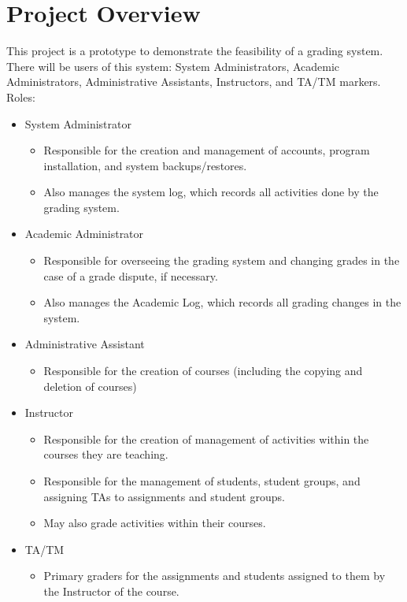 \documentclass{article}
\begin{document}
\section{Project Overview}
This project is a prototype to demonstrate the feasibility of a grading system.
There will be users of this system: System Administrators, Academic Administrators,
Administrative Assistants, Instructors,  and TA/TM markers.\\
Roles:
\begin{itemize}
  \item System Administrator
   \begin{itemize}
     \item Responsible for the creation and management of accounts, program
       installation, and system backups/restores.
     \item Also manages the system log, which records all activities done by the
       grading system.
   \end{itemize}
   \item Academic Administrator
     \begin{itemize}
       \item Responsible for overseeing the grading system and changing grades
         in the case of a grade dispute, if necessary.
       \item Also manages the Academic Log, which records all grading changes
         in the system.
     \end{itemize}
   \item Administrative Assistant
     \begin{itemize}
       \item Responsible for the creation of courses (including the copying
         and deletion of courses)
     \end{itemize}
   \item Instructor
     \begin{itemize}
       \item Responsible for the creation of management of activities within
         the courses they are teaching.
       \item Responsible for the management of students, student groups, and
         assigning TAs to assignments and student groups.
       \item May also grade activities within their courses.
     \end{itemize}
   \item TA/TM
     \begin{itemize}
       \item Primary graders for the assignments and students assigned to them
         by the Instructor of the course.
     \end{itemize}
\end{itemize}
\end{document}
